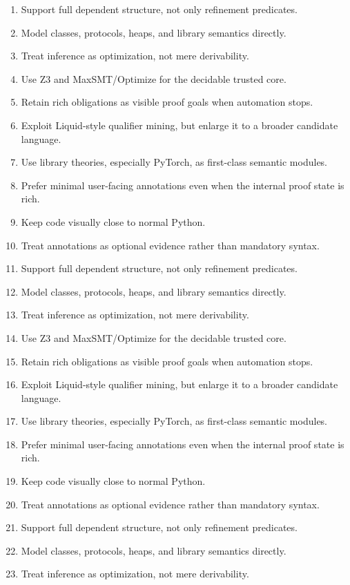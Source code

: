 \documentclass[11pt]{article}
\newcommand{\Zthree}{\textsc{Z3}}
\theoremstyle{definition}
\theoremstyle{plain}
\begin{document}
\begin{enumerate}[label=\arabic*.]
  \item Support full dependent structure, not only refinement predicates.
  \item Model classes, protocols, heaps, and library semantics directly.
  \item Treat inference as optimization, not mere derivability.
  \item Use \Zthree{} and MaxSMT/Optimize for the decidable trusted core.
  \item Retain rich obligations as visible proof goals when automation stops.
  \item Exploit Liquid-style qualifier mining, but enlarge it to a broader candidate language.
  \item Use library theories, especially PyTorch, as first-class semantic modules.
  \item Prefer minimal user-facing annotations even when the internal proof state is rich.
  \item Keep code visually close to normal Python.
  \item Treat annotations as optional evidence rather than mandatory syntax.
  \item Support full dependent structure, not only refinement predicates.
  \item Model classes, protocols, heaps, and library semantics directly.
  \item Treat inference as optimization, not mere derivability.
  \item Use \Zthree{} and MaxSMT/Optimize for the decidable trusted core.
  \item Retain rich obligations as visible proof goals when automation stops.
  \item Exploit Liquid-style qualifier mining, but enlarge it to a broader candidate language.
  \item Use library theories, especially PyTorch, as first-class semantic modules.
  \item Prefer minimal user-facing annotations even when the internal proof state is rich.
  \item Keep code visually close to normal Python.
  \item Treat annotations as optional evidence rather than mandatory syntax.
  \item Support full dependent structure, not only refinement predicates.
  \item Model classes, protocols, heaps, and library semantics directly.
  \item Treat inference as optimization, not mere derivability.

\end{enumerate}
\end{document}
